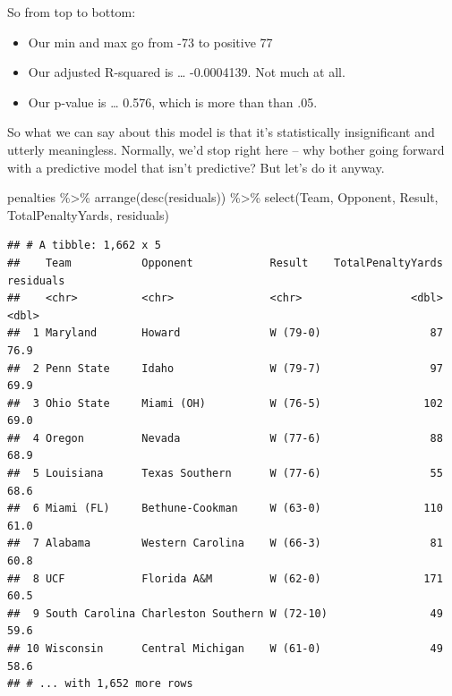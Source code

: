 \documentclass[
]{book}
\newenvironment{Shaded}{\begin{snugshade}}{\end{snugshade}}
\newcommand{\FunctionTok}[1]{\textcolor[rgb]{0.00,0.00,0.00}{#1}}
\newcommand{\NormalTok}[1]{#1}
\newcommand{\OtherTok}[1]{\textcolor[rgb]{0.56,0.35,0.01}{#1}}
\newcommand{\SpecialCharTok}[1]{\textcolor[rgb]{0.00,0.00,0.00}{#1}}
\providecommand{\tightlist}{%
  \setlength{\itemsep}{0pt}\setlength{\parskip}{0pt}}
\begin{document}
So from top to bottom:

\begin{itemize}
\tightlist
\item
  Our min and max go from -73 to positive 77
\item
  Our adjusted R-squared is \ldots{} -0.0004139. Not much at all.
\item
  Our p-value is \ldots{} 0.576, which is more than than .05.
\end{itemize}

So what we can say about this model is that it's statistically insignificant and utterly meaningless. Normally, we'd stop right here -- why bother going forward with a predictive model that isn't predictive? But let's do it anyway.

\begin{Shaded}
\end{Shaded}

\begin{Shaded}
\begin{Highlighting}[]
\NormalTok{penalties }\SpecialCharTok{\%\textgreater{}\%} \FunctionTok{arrange}\NormalTok{(}\FunctionTok{desc}\NormalTok{(residuals)) }\SpecialCharTok{\%\textgreater{}\%} \FunctionTok{select}\NormalTok{(Team, Opponent, Result, TotalPenaltyYards, residuals)}
\end{Highlighting}
\end{Shaded}

\begin{verbatim}
## # A tibble: 1,662 x 5
##    Team           Opponent            Result    TotalPenaltyYards residuals
##    <chr>          <chr>               <chr>                 <dbl>     <dbl>
##  1 Maryland       Howard              W (79-0)                 87      76.9
##  2 Penn State     Idaho               W (79-7)                 97      69.9
##  3 Ohio State     Miami (OH)          W (76-5)                102      69.0
##  4 Oregon         Nevada              W (77-6)                 88      68.9
##  5 Louisiana      Texas Southern      W (77-6)                 55      68.6
##  6 Miami (FL)     Bethune-Cookman     W (63-0)                110      61.0
##  7 Alabama        Western Carolina    W (66-3)                 81      60.8
##  8 UCF            Florida A&M         W (62-0)                171      60.5
##  9 South Carolina Charleston Southern W (72-10)                49      59.6
## 10 Wisconsin      Central Michigan    W (61-0)                 49      58.6
## # ... with 1,652 more rows
\end{verbatim}
\end{document}
